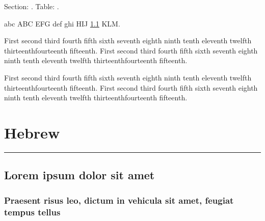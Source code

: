 \documentclass[a4paper]{book}
\begin{document}
Section: \thesection. Table: \thetable.

\bigskip

abc \foreignlanguage{hebrew}{ABC  EFG} def
 ghi \foreignlanguage{hebrew}{HIJ \ref{bla} KLM}. 

\bigskip

{\raggedright First second third fourth fifth sixth seventh eighth
ninth tenth eleventh twelfth thirteenthfourteenth fifteenth. First
second third fourth fifth sixth seventh eighth ninth tenth eleventh
twelfth thirteenthfourteenth fifteenth.\par}

\bigskip

{\raggedleft First second third fourth fifth sixth seventh eighth
ninth tenth eleventh twelfth thirteenthfourteenth fifteenth. First
second third fourth fifth sixth seventh eighth ninth tenth eleventh
twelfth thirteenthfourteenth fifteenth.\par}

\newpage


\chapter{Hebrew}

\hrule

\bigskip

\section{Lorem ipsum dolor sit amet}
\label{bla}

\subsection{Praesent risus leo, dictum in vehicula sit amet, feugiat
tempus tellus}
\end{document}
